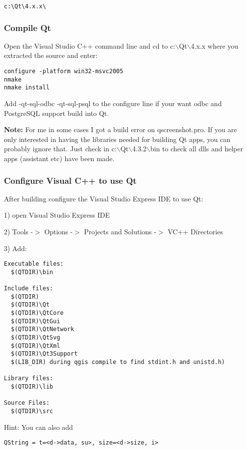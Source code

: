 \begin{verbatim}
c:\Qt\4.x.x\
\end{verbatim}

\subsubsection{Compile Qt}
Open the Visual Studio C++ command line and cd to c:$\backslash$Qt$\backslash$4.x.x where you
extracted the source and enter:

\begin{verbatim}
configure -platform win32-msvc2005
nmake
nmake install
\end{verbatim}

Add -qt-sql-odbc -qt-sql-psql to the configure line if your want odbc and
PostgreSQL support build into Qt.

\textbf{Note:} For me in some cases I got a build error on qscreenshot.pro. If you
are only interested in having the libraries needed for building Qt apps, you 
can probably ignore that. Just check in c:$\backslash$Qt$\backslash$4.3.2$\backslash$bin to check all dlls and 
helper apps (assistant etc) have been made.

\subsubsection{Configure Visual C++ to use Qt}
After building configure the Visual Studio Express IDE to use Qt:

1) open Visual Studio Express IDE

2) Tools -$>$ Options -$>$ Projects and Solutions -$>$ VC++ Directories

3) Add:

\begin{verbatim}
Executable files: 
  $(QTDIR)\bin

Include files: 
  $(QTDIR)
  $(QTDIR)\Qt
  $(QTDIR)\QtCore
  $(QTDIR)\QtGui
  $(QTDIR)\QtNetwork
  $(QTDIR)\QtSvg
  $(QTDIR)\QtXml
  $(QTDIR)\Qt3Support
  $(LIB_DIR) during qgis compile to find stdint.h and unistd.h)

Library files: 
  $(QTDIR)\lib

Source Files:
  $(QTDIR)\src
\end{verbatim}

Hint:  You can also add

\begin{verbatim}
QString = t=<d->data, su>, size=<d->size, i>
\end{verbatim}

